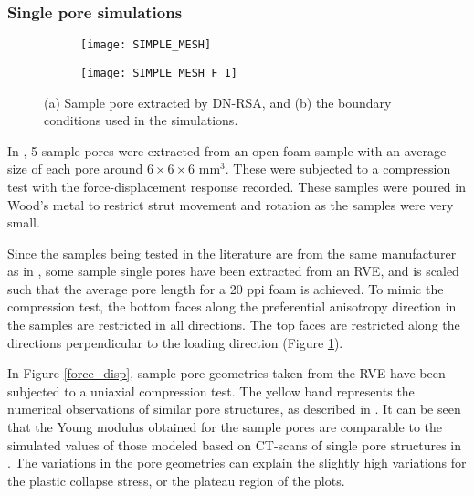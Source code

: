 \subsubsection*{Single pore simulations}
\begin{figure}
	\centering
	\begin{subfigure}[b]{0.33\textwidth}
		\texttt{[image: SIMPLE\_MESH]}
		\caption{}
	\end{subfigure}
	\begin{subfigure}[b]{0.33\textwidth}
		\texttt{[image: SIMPLE\_MESH\_F\_1]}
		\caption{}
	\end{subfigure}
	\caption{(a) Sample pore extracted by DN-RSA, and (b) the boundary conditions used in the simulations.}\label{stress_boundary}
\end{figure}
In \cite {heinzeExperimentalNumericalInvestigation2018}, 5 sample pores were extracted from an open foam sample with an average size of each pore  around $ 6 \times 6 \times 6 $ mm$ ^3 $. These were subjected to a compression test with the force-displacement response recorded. These samples were poured in Wood's metal to restrict strut movement and rotation as the samples were very small.

Since the samples being tested in the literature are from the same manufacturer as in \cite{jungMicrostructuralCharacterisationExperimental2017}, some sample single pores have been extracted from an RVE, and is scaled such that the average pore length for a 20 ppi foam is achieved. To mimic the compression test, the bottom faces along the preferential anisotropy direction in the samples are restricted in all directions. The top faces are restricted along the directions perpendicular to the loading direction (Figure \ref{stress_boundary}).


In Figure \ref{force_disp}, sample pore geometries taken from the RVE have been subjected to a uniaxial compression test. The yellow band represents the numerical observations of similar pore structures, as described in \cite{heinzeExperimentalNumericalInvestigation2018}. It can be seen that the Young modulus obtained for the sample pores are comparable to the simulated values of those modeled based on CT-scans of single pore structures in \cite{heinzeExperimentalNumericalInvestigation2018}. The variations in the pore geometries can explain the slightly high variations for the plastic collapse stress, or the plateau region of the plots.


